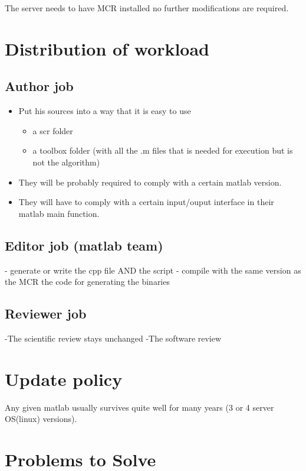 The server needs to have MCR installed no further modifications are required.

\section{Distribution of workload}
\subsection{Author job}

\begin{itemize}
\item Put his sources into a way that it is easy to use
\begin{itemize}
\item a scr folder
\item  a toolbox folder (with all the .m files that is needed for execution but is not the algorithm)
\end{itemize}
\item They will be probably required to comply with a certain matlab version.
\item They will have to comply with a certain input/ouput interface in their matlab main function.
\end{itemize}



\subsection{Editor job (matlab team)}

- generate or write the cpp file AND the script 
- compile with the same version as the MCR the code for generating the binaries

\subsection{Reviewer job}
-The scientific review stays unchanged
-The software review

\section{Update policy}
Any given matlab usually survives quite well for many years (3 or 4 server OS(linux) versions).


\section{Problems to Solve}

